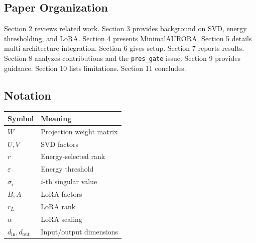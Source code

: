 \subsection{Paper Organization}

Section 2 reviews related work. Section 3 provides background on SVD, 
energy thresholding, and LoRA. Section 4 presents MinimalAURORA. Section 5 
details multi-architecture integration. Section 6 gives setup. Section 7 
reports results. Section 8 analyzes contributions and the \texttt{pres\_gate} 
issue. Section 9 provides guidance. Section 10 lists limitations. Section 
11 concludes.



\subsection{Notation}

\begin{table}[H]
\centering
\small
\begin{tabular}{ll}
\toprule
\textbf{Symbol} & \textbf{Meaning} \\
\midrule
$W$ & Projection weight matrix \\
$U, V$ & SVD factors \\
$r$ & Energy-selected rank \\
$\varepsilon$ & Energy threshold \\
$\sigma_i$ & $i$-th singular value \\
$B, A$ & LoRA factors \\
$r_L$ & LoRA rank \\
$\alpha$ & LoRA scaling \\
$d_\text{in}, d_\text{out}$ & Input/output dimensions \\
\bottomrule
\end{tabular}
\end{table}

